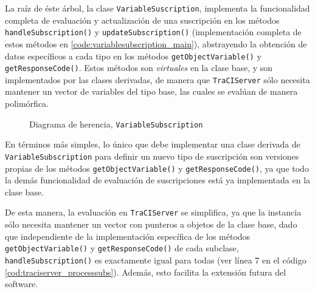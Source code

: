 La raíz de éste árbol, la clase \texttt{VariableSuscription}, implementa la funcionalidad completa de evaluación y actualización de una suscripción en los métodos \texttt{handleSubscription()} y \texttt{updateSubscription()} (implementación completa de estos métodos en \ref{code:variablesubscription_main}), abstrayendo la obtención de datos específicos a cada tipo en los métodos \texttt{getObjectVariable()} y \texttt{getResponseCode()}. Estos métodos son \emph{virtuales} en la clase base, y son implementados por las clases derivadas, de manera que \texttt{TraCIServer} sólo necesita mantener un vector de variables del tipo base, las cuales se evalúan de manera polimórfica.

\begin{figure}
    \centering
    
    \caption{Diagrama de herencia, \texttt{VariableSubscription}}
    \label{fig:cd_variablesub}
\end{figure}

En términos más simples, lo único que debe implementar una clase derivada de \texttt{VariableSubscription} para definir un nuevo tipo de suscripción son versiones propias de los métodos \texttt{getObjectVariable()} y \texttt{getResponseCode()}, ya que todo la demás funcionalidad de evaluación de suscripciones está ya implementada en la clase base. 

%


%

De esta manera, la evaluación en \texttt{TraCIServer} se simplifica, ya que la instancia sólo necesita mantener un vector con punteros a objetos de la clase base, dado que independiente de la implementación específica de los métodos \texttt{getObjectVariable()} y \texttt{getResponseCode()} de cada subclase, \texttt{handleSubscription()} es exactamente igual para todas (ver línea 7 en el código \ref{cod:traciserver_processsubs}). Además, esto facilita la extensión futura del software.

